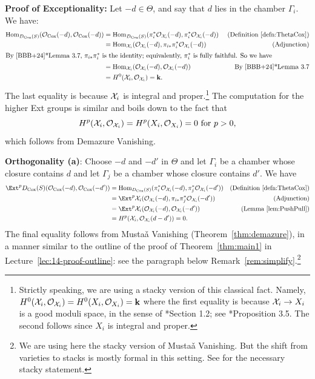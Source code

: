 \documentclass{amsart}
\begin{document}
{\bf Proof of Exceptionality:}  Let $-d\in \Theta$, and say that $d$ lies in the chamber $\Gamma_i$. We have:
\begin{align*}
    \operatorname{Hom}_{D_{\operatorname{Cox}}(S)}({\mathcal O}_{\operatorname{Cox}}(-d), {\mathcal O}_{\operatorname{Cox}}(-d)) &=\operatorname{Hom}_{D_{\operatorname{Cox}}(S)}(\pi_i^*{\mathcal O}_{\mathcal X_i}(-d), \pi_i^*{\mathcal O}_{\mathcal X_i}(-d)) &\text{ (Definition~\ref{defn:ThetaCox})}\\
    &=\operatorname{Hom}_{\mathcal X_i}({\mathcal O}_{\mathcal X_i}(-d), \pi_{i*}\pi_i^*{\mathcal O}_{\mathcal X_i}(-d)) &\text{(Adjunction)}\\
    \intertext{By \cite{BBB+24}*{Lemma 3.7}, $\pi_{i*}\pi_i^*$ is the identity; equivalently, $\pi_i^*$ is fully faithful.  So we have }
    &=\operatorname{Hom}_{\mathcal X_i}({\mathcal O}_{\mathcal X_i}(-d), {\mathcal O}_{\mathcal X_i}(-d)) &\text{By \cite{BBB+24}*{Lemma 3.7}}\\
    &=H^0(\mathcal X_i, {\mathcal O}_{\mathcal X_i}) = \mathbf{k}. &
\end{align*}
The last equality is because $\mathcal X_i$ is integral and proper.\footnote{Strictly speaking, we are using a stacky version of this classical fact.  Namely, $H^0(\mathcal X_i, {\mathcal O}_{\mathcal X_i})= H^0(X_i, {\mathcal O}_{X_i})=\mathbf{k}$ where the first equality is because $\mathcal X_i\to X_i$ is a good moduli space, in the sense of \cite{Alper13}*{Section 1.2}; see \cite{EM12}*{Proposition 3.5}. The second follows since $X_i$ is integral and proper.}
The computation for the higher Ext groups is similar and boils down to the fact that
\[
H^p(\mathcal X_i, {\mathcal O}_{\mathcal X_i}) = H^p(X_i, {\mathcal O}_{X_i}) = 0 \text{ for $p>0$},
\]
which follows from Demazure Vanishing.

{\bf Orthogonality (a)}:  Choose $-d$ and $-d'$ in $\Theta$ and let $\Gamma_i$ be a chamber whose closure contains $d$  and let $\Gamma_j$ be a chamber whose closure contains $d'$.  We have
\begin{align*}
      \Ext^p{D_{\Cox}(S)}(\cO_{\Cox}(-d), \cO_{\Cox}(-d')) &=\Hom_{D_{\Cox}(S)}(\pi_i^*\cO_{\sX_i}(-d), \pi_j^*\cO_{\sX_i}(-d')) &\text{(Definition~\ref{defn:ThetaCox})}\\
    &=\Ext^p{\sX_i}(\cO_{\sX_i}(-d), \pi_{i*}\pi_j^*\cO_{\sX_i}(-d')) &\text{(Adjunction)}\\
    &=\Ext^p{\sX_i}(\cO_{\sX_i}(-d), \cO_{\sX_i}(-d')) &\text{(Lemma~\ref{lem:PushPull})}\\
    &=H^p(\sX_i, \cO_{\sX_i}(d-d'))=0. &
\end{align*}
The final equality follows from Musta\v{a} Vanishing (Theorem~\ref{thm:demazure}), in a manner similar to the outline of the proof of Theorem~\ref{thm:main1} in Lecture~\ref{lec:14-proof-outline}: see the paragraph below Remark~\ref{rem:simplify}.\footnote{We are using here the stacky version of Musta\v{a} Vanishing. But the shift from varieties to stacks is mostly formal in this setting.  See \cite[Theorem 2.11]{BBB+24} for the necessary stacky statement.}%
\end{document}
